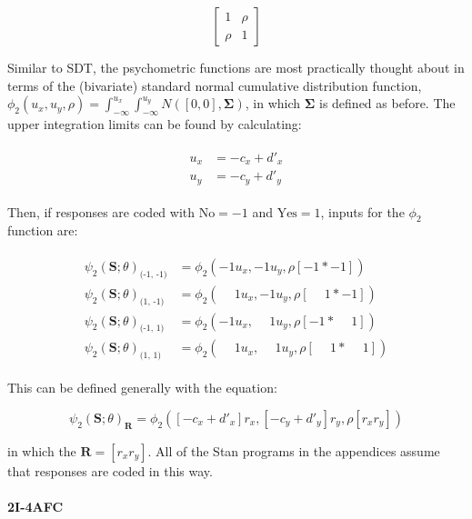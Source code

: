 \documentclass{article}\usepackage{knitr}
\begin{document}
$$
\begin{bmatrix}
1 & \rho \\
\rho & 1
\end{bmatrix}
$$

Similar to SDT, the psychometric functions are most practically thought about in terms of the (bivariate) standard normal cumulative distribution function, $\phi_2(u_x, u_y, \rho) = \int_{-\infty}^{u_x} \int_{-\infty}^{u_y} N([0,0], \bm{\Sigma})$, in which $\bm{\Sigma}$ is defined as before. The upper integration limits can be found by calculating:

\begin{align*}
\begin{split}
u_x &= -c_x + d'_x \\
u_y &= -c_y + d'_y
\end{split}
\end{align*}

Then, if responses are coded with $\text{No} = -1$ and $ \text{Yes} = 1$, inputs for the $\phi_2$ function are:

\begin{align*}
\begin{split}
\psi_2(\bm{S}; \theta)_{\text{(-1, -1)}} &= \phi_2(-1 u_x, -1 u_y, \rho [-1 * -1]) \\
\psi_2(\bm{S}; \theta)_{\text{(1, -1)}}  &= \phi_2(\phantom{-}1 u_x, -1 u_y, \rho [\phantom{-}1 * -1]) \\
\psi_2(\bm{S}; \theta)_{\text{(-1, 1)}}  &= \phi_2(-1 u_x, \phantom{-}1 u_y, \rho [-1 * \phantom{-}1]) \\
\psi_2(\bm{S}; \theta)_{\text{(1, 1)}}   &= \phi_2(\phantom{-}1 u_x, \phantom{-}1 u_y, \rho [\phantom{-}1 * \phantom{-}1]) 
\end{split}
\end{align*}

This can be defined generally with the equation:

\begin{equation}
\psi_2(\bm{S}; \theta)_{\bm{R}} = \phi_2([-c_x + d'_x]r_x, [-c_y + d'_y] r_y, \rho [r_x r_y])
\label{eq:generalPfun}
\end{equation}

in which the $\bm{R} = [r_x r_y]$. All of the Stan \citep{stan2019} programs in the appendices assume that responses are coded in this way.

\paragraph{2I-4AFC}
\end{document}
